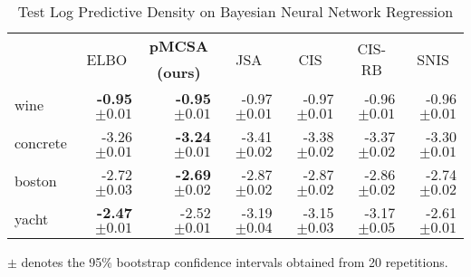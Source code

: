
\begin{table*}
  \centering
  \caption{Test Log Predictive Density on Bayesian Neural Network Regression}\label{table:gp}
  \vspace{-0.05in}
  \setlength{\tabcolsep}{4pt}
  \begin{threeparttable}
  \begin{tabular}{lrrrrrr}
    \toprule
    & \multicolumn{1}{c}{\multirow{2}{*}{ELBO}} & \multicolumn{1}{c}{\multirow{1}{*}{\textbf{pMCSA}}} & \multicolumn{1}{c}{\multirow{2}{*}{JSA}} & \multicolumn{1}{c}{\multirow{2}{*}{CIS}} & \multicolumn{1}{c}{\multirow{2}{*}{CIS-RB}} & \multicolumn{1}{c}{\multirow{2}{*}{SNIS}} \\
    & & \multicolumn{1}{c}{\textbf{(ours)}} & & & & \\
    \midrule
    wine & {\bf-0.95 {\scriptsize{\(\pm 0.01\)}}} & {\bf-0.95 {\scriptsize{\(\pm 0.01\)}}} & {-0.97 {\scriptsize{\(\pm 0.01\)}}} & {-0.97 {\scriptsize{\(\pm 0.01\)}}} & {-0.96 {\scriptsize{\(\pm 0.01\)}}} & {-0.96 {\scriptsize{\(\pm 0.01\)}}} \\
    concrete & {-3.26 {\scriptsize{\(\pm 0.01\)}}} & {\bf-3.24 {\scriptsize{\(\pm 0.01\)}}} & {-3.41 {\scriptsize{\(\pm 0.02\)}}} & {-3.38 {\scriptsize{\(\pm 0.02\)}}} & {-3.37 {\scriptsize{\(\pm 0.02\)}}} & {-3.30 {\scriptsize{\(\pm 0.01\)}}} \\
    boston & {-2.72 {\scriptsize{\(\pm 0.03\)}}} & {\bf-2.69 {\scriptsize{\(\pm 0.02\)}}} & {-2.87 {\scriptsize{\(\pm 0.02\)}}} & {-2.87 {\scriptsize{\(\pm 0.02\)}}} & {-2.86 {\scriptsize{\(\pm 0.02\)}}} & {-2.74 {\scriptsize{\(\pm 0.02\)}}} \\
    yacht & {\bf-2.47 {\scriptsize{\(\pm 0.01\)}}} & {-2.52 {\scriptsize{\(\pm 0.01\)}}} & {-3.19 {\scriptsize{\(\pm 0.04\)}}} & {-3.15 {\scriptsize{\(\pm 0.03\)}}} & {-3.17 {\scriptsize{\(\pm 0.05\)}}} & {-2.61 {\scriptsize{\(\pm 0.01\)}}} \\\bottomrule
  \end{tabular}
  \begin{tablenotes}
    \item[]{\footnotesize \(\pm\) denotes the 95\% bootstrap confidence intervals obtained from 20 repetitions.}
  \end{tablenotes}
  \end{threeparttable}
  \vspace{-0.15in}
\end{table*}

